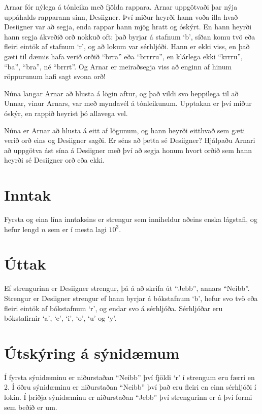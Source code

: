 

Arnar fór nýlega á tónleika með fjölda rappara. Arnar uppgötvaði þar nýja
uppáhalds rapparann sinn, Desiigner. Því miður heyrði hann voða illa hvað
Desiigner var að segja, enda rappar hann mjög hratt og óskýrt. En hann heyrði
hann segja ákveðið orð nokkuð oft: það byrjar á stafnum `b', síðan komu tvö
eða fleiri eintök af stafnum `r', og að lokum var sérhljóði. Hann er ekki viss,
en það gæti til dæmis hafa verið orðið ``brra'' eða ``brrrru'', en klárlega ekki
``krrru'', ``ba'', ``bra'', né ``brrrt''. Og Arnar er meiraðsegja viss að enginn af
hinum röppurunum hafi sagt svona orð!

Núna langar Arnar að hlusta á lögin aftur, og það vildi svo heppilega til að
Unnar, vinur Arnars, var með myndavél á tónleikunum. Upptakan er því miður
óskýr, en rappið heyrist þó allavega vel.

Núna er Arnar að hlusta á eitt af lögunum, og hann heyrði eitthvað sem gæti
verið orð eins og Desiigner sagði. Er séns að þetta sé Desiigner? Hjálpaðu
Arnari að uppgötva ást sína á Desiigner með því að segja honum hvort orðið sem
hann heyrði sé Desiigner orð eða ekki.

\section*{Inntak}
Fyrsta og eina lína inntaksins er strengur sem inniheldur aðeins enska
lágstafi, og hefur lengd $n$ sem er í mesta lagi $10^3$.

\section*{Úttak}
Ef strengurinn er Desiigner strengur, þá á að skrifa út ``Jebb'', annars ``Neibb''.
Strengur er Desiigner strengur ef hann byrjar á bókstafnum `b', hefur svo
tvö eða fleiri eintök af bókstafnum `r', og endar svo á sérhljóða. Sérhljóðar
eru bókstafirnir `a', `e', `i', `o', `u' og `y'.

\section*{Útskýring á sýnidæmum}
Í fyrsta sýnidæminu er niðurstaðan ``Neibb'' því fjöldi `r' í strengum eru færri en 2.
Í öðru sýnidæminu er niðurstaðan ``Neibb'' því það eru fleiri en einn sérhljóði
í lokin. Í þriðja sýnidæminu er niðurstaðan ``Jebb'' því strengurinn er á því
formi sem beðið er um.

